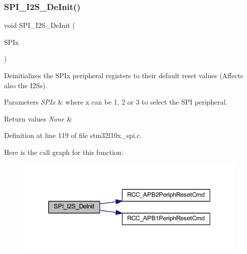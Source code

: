 \subsubsection{\texorpdfstring{S\+P\+I\+\_\+\+I2\+S\+\_\+\+De\+Init()}{SPI\_I2S\_DeInit()}}
{\footnotesize\ttfamily void S\+P\+I\+\_\+\+I2\+S\+\_\+\+De\+Init (\begin{DoxyParamCaption}\item[{\hyperlink{struct_s_p_i___type_def}{S\+P\+I\+\_\+\+Type\+Def} $\ast$}]{S\+P\+Ix }\end{DoxyParamCaption})}



Deinitializes the S\+P\+Ix peripheral registers to their default reset values (Affects also the I2\+Ss). 


\begin{DoxyParams}{Parameters}
{\em S\+P\+Ix} & where x can be 1, 2 or 3 to select the S\+PI peripheral. \\
\hline
\end{DoxyParams}

\begin{DoxyRetVals}{Return values}
{\em None} & \\
\hline
\end{DoxyRetVals}


Definition at line 119 of file stm32f10x\+\_\+spi.\+c.

Here is the call graph for this function\+:
\nopagebreak
\begin{figure}[H]
\begin{center}
\leavevmode
\includegraphics[width=339pt]{group___s_p_i___private___functions_gabe36880945fa56785283a9c0092124cc_cgraph}
\end{center}
\end{figure}
\mbox{\label{group___s_p_i___private___functions_gabed5b91a8576e6d578f364cc0e807e4a}} 
